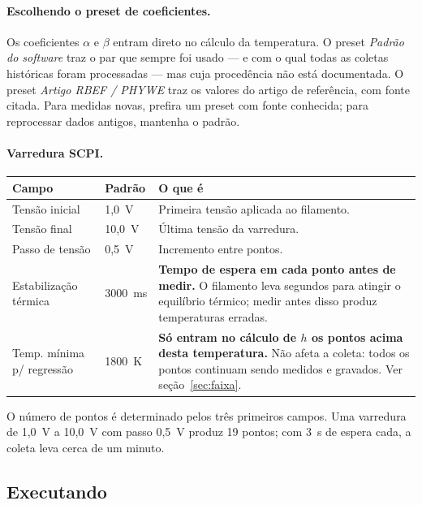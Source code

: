 \documentclass[11pt,a4paper]{article}
\newcommand{\campo}[1]{\textsf{\textit{#1}}}
\begin{document}
\paragraph{Escolhendo o preset de coeficientes.}
Os coeficientes $\alpha$ e $\beta$ entram direto no cálculo da temperatura. O
preset \campo{Padrão do software} traz o par que sempre foi usado --- e com o
qual todas as coletas históricas foram processadas --- mas cuja procedência não
está documentada. O preset \campo{Artigo RBEF / PHYWE} traz os valores do
artigo de referência, com fonte citada. Para medidas novas, prefira um preset
com fonte conhecida; para reprocessar dados antigos, mantenha o padrão.

\paragraph{Varredura SCPI.}

\begin{center}
\begin{tabular}{@{}p{4.6cm}p{2.2cm}p{7.5cm}@{}}
\toprule
\textbf{Campo} & \textbf{Padrão} & \textbf{O que é} \\
\midrule
Tensão inicial & 1,0~V & Primeira tensão aplicada ao filamento. \\[0.3em]
Tensão final & 10,0~V & Última tensão da varredura. \\[0.3em]
Passo de tensão & 0,5~V & Incremento entre pontos. \\[0.3em]
Estabilização térmica & 3000~ms &
\textbf{Tempo de espera em cada ponto antes de medir.} O filamento leva
segundos para atingir o equilíbrio térmico; medir antes disso produz
temperaturas erradas. \\[0.3em]
Temp. mínima p/ regressão & 1800~K &
\textbf{Só entram no cálculo de $h$ os pontos acima desta temperatura.} Não
afeta a coleta: todos os pontos continuam sendo medidos e gravados. Ver
seção~\ref{sec:faixa}. \\
\bottomrule
\end{tabular}
\end{center}

O número de pontos é determinado pelos três primeiros campos. Uma varredura de
1,0~V a 10,0~V com passo 0,5~V produz 19 pontos; com 3~s de espera cada, a
coleta leva cerca de um minuto.

\subsection{Executando}
\end{document}
